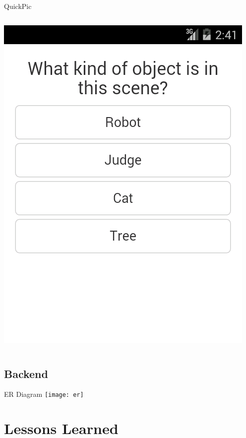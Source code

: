 \documentclass[aspectratio=169]{beamer}
\begin{document}
\begin{frame}{QuickPic}
\begin{columns}[c]
\begin{column}{0.5\columnwidth}
      \includegraphics[width=\textwidth,height=\textheight,keepaspectratio]{ss_quickpic_options}
    \end{column}
  \end{columns}
\end{frame}

\subsection{Backend}

\begin{frame}{ER Diagram}
  \centering
  \texttt{[image: er]}
\end{frame}

\section{Lessons Learned}
\end{document}
